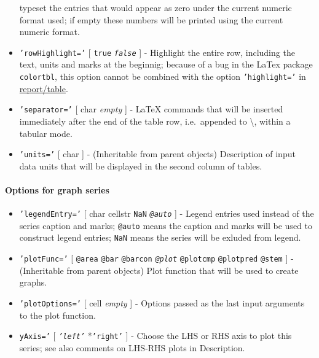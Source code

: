 \begin{itemize}
   typeset the entries that would appear as zero under the current
   numeric format used; if empty these numbers will be printed using the
   current numeric format.
 \item
   \texttt{'rowHighlight='} {[} \texttt{true} \textbar{}
   \emph{\texttt{false}} {]} - Highlight the entire row, including the
   text, units and marks at the beginnig; because of a bug in the LaTex
   package \texttt{colortbl}, this option cannot be combined with the
   option \texttt{'highlight='} in \url{report/table}.
 \item
   \texttt{'separator='} {[} char \textbar{} \emph{empty} {]} - LaTeX
   commands that will be inserted immediately after the end of the table
   row, i.e.~appended to \textbackslash{}, within a tabular mode.
 \item
   \texttt{'units='} {[} char {]} - (Inheritable from parent objects)
   Description of input data units that will be displayed in the second
   column of tables.
 \end{itemize}
 
 \paragraph{Options for graph series}
 
 \begin{itemize}
 \item
   \texttt{'legendEntry='} {[} char \textbar{} cellstr \textbar{}
   \texttt{NaN} \textbar{} \emph{\texttt{@auto}} {]} - Legend entries
   used instead of the series caption and marks; \texttt{@auto} means the
   caption and marks will be used to construct legend entries;
   \texttt{NaN} means the series will be exluded from legend.
 \item
   \texttt{'plotFunc='} {[} \texttt{@area} \textbar{} \texttt{@bar}
   \textbar{} \texttt{@barcon} \textbar{} \emph{\texttt{@plot}}
   \textbar{} \texttt{@plotcmp} \textbar{} \texttt{@plotpred} \textbar{}
   \texttt{@stem} {]} - (Inheritable from parent objects) Plot function
   that will be used to create graphs.
 \item
   \texttt{'plotOptions='} {[} cell \textbar{} \emph{empty} {]} - Options
   passed as the last input arguments to the plot function.
 \item
   \texttt{yAxis='} {[} \emph{\texttt{'left'}} \textbar{}
   *\texttt{'right'} {]} - Choose the LHS or RHS axis to plot this
   series; see also comments on LHS-RHS plots in Description.
 \end{itemize}
 
